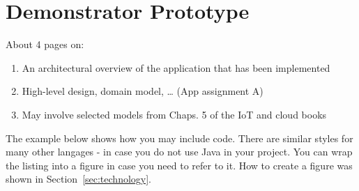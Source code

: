 \section{Demonstrator Prototype}
\label{sec:design}

About 4 pages on:

\begin{enumerate}

\item An architectural overview of the application that has been implemented
\item High-level design, domain model, … (App assignment A)
\item May involve selected models from Chaps. 5 of the IoT and cloud books


\end{enumerate}

The example below shows how you may include code. There are similar
styles for many other langages - in case you do not use Java in your
project. You can wrap the listing into a figure in case you need to
refer to it. How to create a figure was shown in Section~\ref{sec:technology}.



